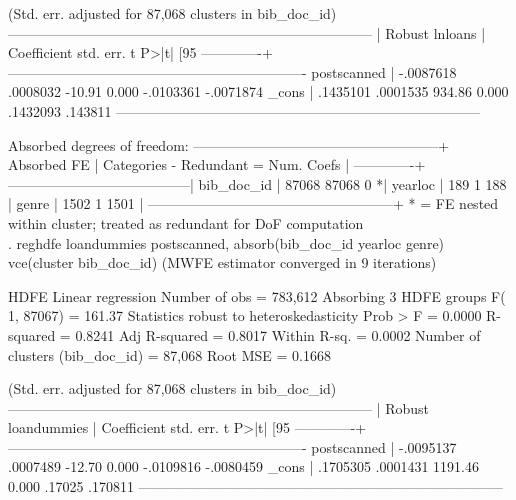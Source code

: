 {                        (Std. err. adjusted for 87,068 clusters in bib_doc_id)
------------------------------------------------------------------------------
             |               Robust
     lnloans | Coefficient  std. err.      t    P>|t|     [95%
-------------+----------------------------------------------------------------
 postscanned |  -.0087618   .0008032   -10.91   0.000    -.0103361   -.0071874
       _cons |   .1435101   .0001535   934.86   0.000     .1432093     .143811
------------------------------------------------------------------------------

Absorbed degrees of freedom:
-----------------------------------------------------+
 Absorbed FE | Categories  - Redundant  = Num. Coefs |
-------------+---------------------------------------|
  bib_doc_id |     87068       87068           0    *|
     yearloc |       189           1         188     |
       genre |      1502           1        1501     |
-----------------------------------------------------+
* = FE nested within cluster; treated as redundant for DoF computation
\\
. reghdfe loandummies postscanned, absorb(bib_doc_id yearloc genre) vce(cluster bib_doc_id)
(MWFE estimator converged in 9 iterations)

HDFE Linear regression                            Number of obs   =    783,612
Absorbing 3 HDFE groups                           F(   1,  87067) =     161.37
Statistics robust to heteroskedasticity           Prob > F        =     0.0000
                                                  R-squared       =     0.8241
                                                  Adj R-squared   =     0.8017
                                                  Within R-sq.    =     0.0002
Number of clusters (bib_doc_id) =     87,068      Root MSE        =     0.1668

                        (Std. err. adjusted for 87,068 clusters in bib_doc_id)
------------------------------------------------------------------------------
             |               Robust
 loandummies | Coefficient  std. err.      t    P>|t|     [95%
-------------+----------------------------------------------------------------
 postscanned |  -.0095137   .0007489   -12.70   0.000    -.0109816   -.0080459
       _cons |   .1705305   .0001431  1191.46   0.000       .17025     .170811
------------------------------------------------------------------------------

}
